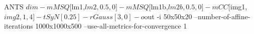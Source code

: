 ANTS $dim   -m  MSQ[$lm1,$lm2,0.5,0] -m  MSQ[$lm1b,$lm2b,0.5,0] -m  CC[$img1,$img2,1,4]  -t SyN[0.25]  -r Gauss[3,0] -o $out -i 50x50x20 --number-of-affine-iterations 1000x1000x500 --use-all-metrics-for-convergence 1  
